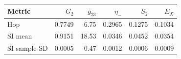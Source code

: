 \begin{tabular}{lrrrrr}
\toprule
Metric & $G_2$ & $g_{23}$ & $\eta_-$ & $S_2$ & $E_X$ \\
\midrule
Hop & 0.7749 & 6.75 & 0.2965 & 0.1275 & 0.1034 \\
SI mean & 0.9151 & 18.53 & 0.0346 & 0.0452 & 0.0354 \\
SI sample SD & 0.0005 & 0.47 & 0.0012 & 0.0006 & 0.0009 \\
\bottomrule
\end{tabular}
